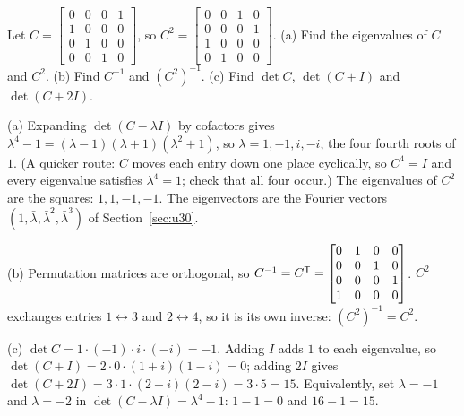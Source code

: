 \begin{exercise}[Question 7]\label{exr:u40-q7}
Let $C=\begin{bmatrix}0&0&0&1\\1&0&0&0\\0&1&0&0\\0&0&1&0\end{bmatrix}$, so $C^{2}=\begin{bmatrix}0&0&1&0\\0&0&0&1\\1&0&0&0\\0&1&0&0\end{bmatrix}$.
(a) Find the eigenvalues of $C$ and $C^{2}$.
(b) Find $C^{-1}$ and $(C^{2})^{-1}$.
(c) Find $\det C$, $\det(C+I)$ and $\det(C+2I)$.
\end{exercise}
\begin{solution}
(a) Expanding $\det(C-\lambda I)$ by cofactors gives $\lambda^{4}-1=(\lambda-1)(\lambda+1)(\lambda^{2}+1)$, so $\lambda=1,-1,i,-i$, the four fourth roots of $1$. (A quicker route: $C$ moves each entry down one place cyclically, so $C^{4}=I$ and every eigenvalue satisfies $\lambda^{4}=1$; check that all four occur.) The eigenvalues of $C^{2}$ are the squares: $1,1,-1,-1$. The eigenvectors are the Fourier vectors $(1,\bar\lambda,\bar\lambda^{2},\bar\lambda^{3})$ of Section~\ref{sec:u30}.

(b) Permutation matrices are orthogonal, so $C^{-1}=C^{\mathsf{T}}=\begin{bmatrix}0&1&0&0\\0&0&1&0\\0&0&0&1\\1&0&0&0\end{bmatrix}$. $C^{2}$ exchanges entries $1\leftrightarrow3$ and $2\leftrightarrow4$, so it is its own inverse: $(C^{2})^{-1}=C^{2}$.

(c) $\det C=1\cdot(-1)\cdot i\cdot(-i)=-1$. Adding $I$ adds $1$ to each eigenvalue, so $\det(C+I)=2\cdot0\cdot(1+i)(1-i)=0$; adding $2I$ gives $\det(C+2I)=3\cdot1\cdot(2+i)(2-i)=3\cdot5=15$. Equivalently, set $\lambda=-1$ and $\lambda=-2$ in $\det(C-\lambda I)=\lambda^{4}-1$: $1-1=0$ and $16-1=15$.
\end{solution}

